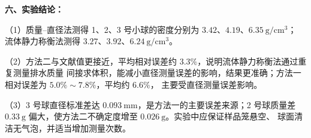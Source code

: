 \documentclass[12pt,a4paper,fontset=windows]{ctexart}
\begin{document}
\noindent\textbf{六、实验结论：}

\vspace{0.1cm}
（1）质量--直径法测得 1、2、3 号小球的密度分别为 $3.42$、$4.19$、$6.35\ \mathrm{g/cm^3}$；
流体静力称衡法测得 $3.27$、$3.92$、$6.24\ \mathrm{g/cm^3}$。

（2）方法二与文献值更接近，平均相对误差约 $3.3\%$，说明流体静力称衡法通过重复测量排水质量
间接求体积，能减小直径测量误差的影响，结果更准确；方法一相对误差为 $5.0\%\sim7.8\%$，平均约 $6.6\%$，
主要受直径测量误差影响。

（3）3 号球直径标准差达 $0.093\ \mathrm{mm}$，是方法一的主要误差来源；2 号球质量差
$0.33\ \mathrm{g}$ 偏大，使方法二不确定度增至 $0.026\ \mathrm{g}$。实验中应保证样品笼悬空、
球面清洁无气泡，并适当增加测量次数。
\end{document}
